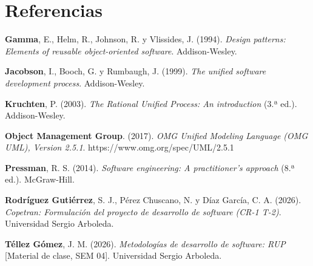 \documentclass[11pt,a4paper]{article}
\newenvironment{hangparas}{%
  \begin{list}{}{%
    \setlength{\leftmargin}{1.5em}%
    \setlength{\itemindent}{-1.5em}%
    \setlength{\itemsep}{0.8em}%
    \setlength{\parsep}{0pt}%
    \setlength{\topsep}{0pt}%
  }%
}{\end{list}}
\begin{document}
\clearpage
\section*{Referencias}
\label{sec:referencias}

\begin{hangparas}
\item \textbf{Gamma}, E., Helm, R., Johnson, R. y Vlissides, J. (1994). \emph{Design patterns:
Elements of reusable object-oriented software}. Addison-Wesley.

\item \textbf{Jacobson}, I., Booch, G. y Rumbaugh, J. (1999). \emph{The unified software development
process}. Addison-Wesley.

\item \textbf{Kruchten}, P. (2003). \emph{The Rational Unified Process: An introduction} (3.ª ed.).
Addison-Wesley.

\item \textbf{Object Management Group}. (2017). \emph{OMG Unified Modeling Language (OMG UML),
Version 2.5.1}. https://www.omg.org/spec/UML/2.5.1

\item \textbf{Pressman}, R. S. (2014). \emph{Software engineering: A practitioner's approach}
(8.ª ed.). McGraw-Hill.

\item \textbf{Rodríguez Gutiérrez}, S. J., Pérez Chuscano, N. y Díaz García, C. A. (2026). \emph{Copetran:
Formulación del proyecto de desarrollo de software (CR-1 T-2)}. Universidad Sergio Arboleda.

\item \textbf{Téllez Gómez}, J. M. (2026). \emph{Metodologías de desarrollo de software: RUP}
[Material de clase, SEM 04]. Universidad Sergio Arboleda.
\end{hangparas}
\end{document}
